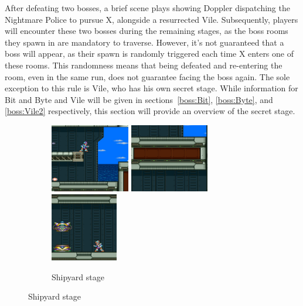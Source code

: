 After defeating two bosses, a brief scene plays showing Doppler dispatching the Nightmare Police to pursue X, alongside a resurrected Vile. Subsequently, players will encounter these two bosses during the remaining stages, as the boss rooms they spawn in are mandatory to traverse. However, it's not guaranteed that a boss will appear, as their spawn is randomly triggered each time X enters one of these rooms. This randomness means that being defeated and re-entering the room, even in the same run, does not guarantee facing the boss again. The sole exception to this rule is Vile, who has his own secret stage. While information for Bit and Byte and Vile will be given in sections~\ref{boss:Bit}, \ref{boss:Byte}, and \ref{boss:Vile2} respectively, this section will provide an overview of the secret stage.\begin{figure}[htp]
	\centering
	\begin{subfigure}{\linewidth}
		\centering
		\includegraphics[height=3cm]{figures/X3/Crush_crawfish/vile_1.jpg}
		\includegraphics[height=3cm]{figures/X3/Crush_crawfish/vile_11.jpg}
		\includegraphics[height=3cm]{figures/X3/Crush_crawfish/vile_2.jpg}
		\caption{Shipyard stage}
	\end{subfigure}
	

\end{figure}

